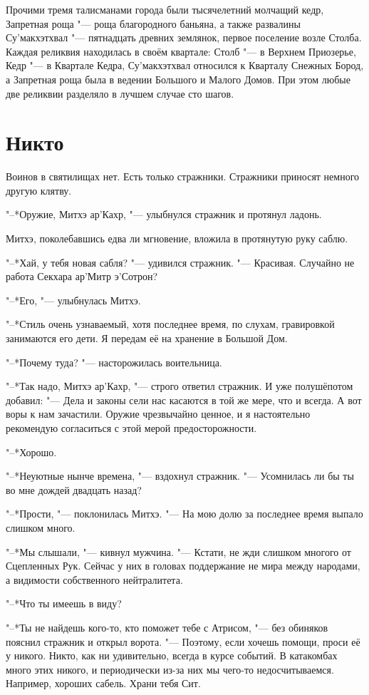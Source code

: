 \documentclass[a4paper,10pt]{book}
\begin{document}
Прочими тремя талисманами города были тысячелетний молчащий кедр, Запретная роща "--- роща благородного баньяна, а также развалины Су'макхэтхвал "--- пятнадцать древних землянок, первое поселение возле Столба. Каждая реликвия находилась в своём квартале: Столб "--- в Верхнем Приозерье, Кедр "--- в Квартале Кедра, Су'макхэтхвал относился к Кварталу Снежных Бород, а Запретная роща была в ведении Большого и Малого Домов. При этом любые две реликвии разделяло в лучшем случае сто шагов.

\section{Никто}

Воинов в святилищах нет. Есть только стражники. Стражники приносят немного 
другую клятву.

"--*Оружие, Митхэ ар'Кахр, "--- улыбнулся стражник и протянул ладонь.

Митхэ, поколебавшись едва ли мгновение, вложила в протянутую руку саблю.

"--*Хай, у тебя новая сабля? "--- удивился стражник. "--- Красивая. Случайно не 
работа Секхара ар'Митр э'Сотрон?

"--*Его, "--- улыбнулась Митхэ.

"--*Стиль очень узнаваемый, хотя последнее время, по слухам, гравировкой 
занимаются его дети. Я передам её на хранение в Большой Дом.

"--*Почему туда? "--- насторожилась воительница.

"--*Так надо, Митхэ ар'Кахр, "--- строго ответил стражник. И уже полушёпотом 
добавил: "--- Дела и законы сели нас касаются в той же мере, что и всегда. А 
вот 
воры к нам зачастили. Оружие чрезвычайно ценное, и я настоятельно рекомендую 
согласиться с этой мерой предосторожности.

"--*Хорошо.

"--*Неуютные нынче времена, "--- вздохнул стражник. "--- Усомнилась ли бы ты во 
мне дождей двадцать назад?

"--*Прости, "--- поклонилась Митхэ. "--- На мою долю за последнее время выпало 
слишком много.

"--*Мы слышали, "--- кивнул мужчина. "--- Кстати, не жди слишком многого от 
Сцепленных Рук. Сейчас у них в головах поддержание не мира между народами, а 
видимости собственного нейтралитета.

"--*Что ты имеешь в виду?

"--*Ты не найдешь кого-то, кто поможет тебе с Атрисом, "--- без обиняков 
пояснил 
стражник и открыл ворота. "--- Поэтому, если хочешь помощи, проси её у никого. 
Никто, как ни удивительно, всегда в курсе событий. В катакомбах много этих 
никого, и периодически из-за них мы чего-то недосчитываемся. Например, хороших 
сабель. Храни тебя Сит.
\end{document}
